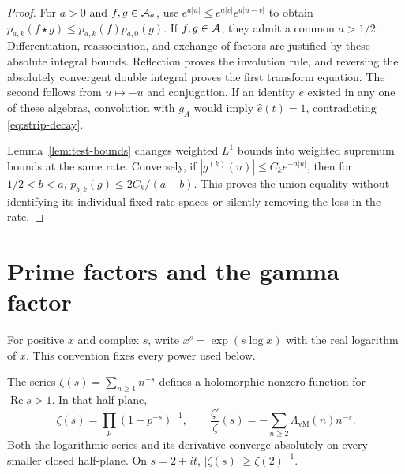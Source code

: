 \begin{proof}
For $a>0$ and $f,g\in\mathcal A_a$, use
$e^{a|u|}\leq e^{a|v|}e^{a|u-v|}$ to obtain
$p_{a,k}(f\star g)\leq p_{a,k}(f)p_{a,0}(g)$.
If $f,g\in\mathcal A$, they admit a common $a>1/2$.
Differentiation, reassociation, and exchange of factors are justified by
these absolute integral bounds.  Reflection proves the involution rule,
and reversing the absolutely convergent double integral proves the first
transform equation.  The second follows from $u\mapsto-u$ and conjugation.
If an identity $e$ existed in any one of these algebras, convolution with
$g_A$ would imply $\widehat e(t)=1$, contradicting \eqref{eq:strip-decay}.

Lemma~\ref{lem:test-bounds} changes weighted $L^1$ bounds into weighted
supremum bounds at the same rate.  Conversely, if
$|g^{(k)}(u)|\leq C_k e^{-a|u|}$, then for $1/2<b<a$,
$p_{b,k}(g)\leq2C_k/(a-b)$.
This proves the union equality without identifying its individual fixed-rate
spaces or silently removing the loss in the rate.
\end{proof}

\section{Prime factors and the gamma factor}
\label{sec:euler-gamma}

For positive $x$ and complex $s$, write $x^s=\exp(s\log x)$ with the real
logarithm of $x$.  This convention fixes every power used below.

\begin{lemma}
\label{lem:euler}
The series $\zeta(s)=\sum_{n\geq1}n^{-s}$ defines a holomorphic nonzero
function for $\operatorname{Re}s>1$.  In that half-plane,
\begin{equation}
 \zeta(s)=\prod_p(1-p^{-s})^{-1},\qquad
 \frac{\zeta'}{\zeta}(s)=-\sum_{n\geq2}\Lambda_{\mathrm{vM}}(n)n^{-s}.
 \label{eq:euler}
\end{equation}
Both the logarithmic series and its derivative converge absolutely on every
smaller closed half-plane.  On $s=2+it$, $|\zeta(s)|\geq\zeta(2)^{-1}$.
\end{lemma}

